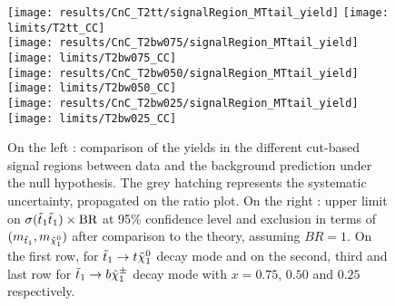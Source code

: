     \begin{figure}[h!]
        \centering
        \texttt{[image: results/CnC\_T2tt/signalRegion\_MTtail\_yield]}
        \texttt{[image: limits/T2tt\_CC]}\\
        \texttt{[image: results/CnC\_T2bw075/signalRegion\_MTtail\_yield]}
        \texttt{[image: limits/T2bw075\_CC]}\\
        \texttt{[image: results/CnC\_T2bw050/signalRegion\_MTtail\_yield]}
        \texttt{[image: limits/T2bw050\_CC]}\\
        \texttt{[image: results/CnC\_T2bw025/signalRegion\_MTtail\_yield]}
        \texttt{[image: limits/T2bw025\_CC]}\\
        \caption{On the left : comparison of the yields in the different cut-based signal
        regions between data and the background prediction under the null hypothesis. The
        grey hatching represents the systematic uncertainty, propagated on the ratio plot.
        On the right : upper limit on $\sigma(\tilde{t}_1\tilde{t}_1) \times \text{BR}$ at 95\% confidence level and exclusion in terms of
        $(m_{\tilde{t}_1},m_{\tilde{\chi}_1^0})$ after comparison to the theory, assuming
        $BR = 1$. On the first row, for $\tilde{t}_1 \rightarrow t \tilde{\chi}_1^0$ decay mode and on
        the second, third and last row for $\tilde{t}_1 \rightarrow b \tilde{\chi}_1^\pm$ decay mode
        with $x=0.75$, $0.50$ and $0.25$ respectively.}
        \label{fig:resultsCnC}
    \end{figure}

